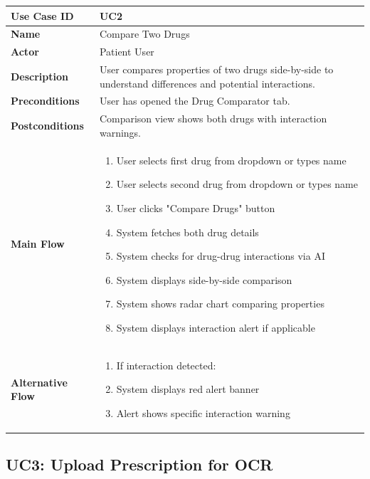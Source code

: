 \documentclass[12pt,a4paper]{report}
\begin{document}
\begin{tabularx}{\textwidth}{|l|X|}
\hline
\textbf{Use Case ID} & UC2 \\
\hline
\textbf{Name} & Compare Two Drugs \\
\hline
\textbf{Actor} & Patient User \\
\hline
\textbf{Description} & User compares properties of two drugs side-by-side to understand differences and potential interactions. \\
\hline
\textbf{Preconditions} & User has opened the Drug Comparator tab. \\
\hline
\textbf{Postconditions} & Comparison view shows both drugs with interaction warnings. \\
\hline
\textbf{Main Flow} & 
\begin{enumerate}[nosep]
    \item User selects first drug from dropdown or types name
    \item User selects second drug from dropdown or types name
    \item User clicks "Compare Drugs" button
    \item System fetches both drug details
    \item System checks for drug-drug interactions via AI
    \item System displays side-by-side comparison
    \item System shows radar chart comparing properties
    \item System displays interaction alert if applicable
\end{enumerate} \\
\hline
\textbf{Alternative Flow} & 
\begin{enumerate}[nosep]
    \item[5a.] If interaction detected:
    \item[5a.1] System displays red alert banner
    \item[5a.2] Alert shows specific interaction warning
\end{enumerate} \\
\hline
\end{tabularx}

\subsection{UC3: Upload Prescription for OCR}
\end{document}

